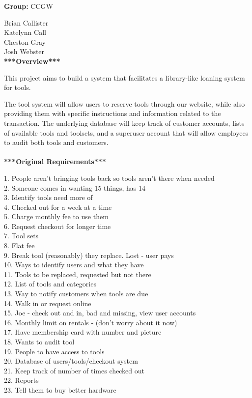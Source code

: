 \documentclass[12pt,letterpaper]{article}
\newcommand\name{
Brian Callister\\
Katelynn Call\\
Cheston Gray\\
Josh Webster
}
\begin{document}
\textbf{Group: } CCGW

\name\\
    
\textbf{***Overview***}

This project aims to build a system that facilitates a library-like loaning system for tools.

The tool system will allow users to reserve tools through our website, while also providing them with specific instructions and information related to the transaction.  The underlying database will keep track of customer accounts, lists of available tools and toolsets, and a superuser account that will allow employees to audit both tools and customers.\\\\

\textbf{***Original Requirements***}

1. People aren't bringing tools back so tools aren't there when needed\\
2. Someone comes in wanting 15 things, has 14\\
3.  Identify tools need more of\\
4.  Checked out for a week at a time\\
5. Charge monthly fee to use them\\
6.  Request checkout for longer time\\
7. Tool sets\\
8. Flat fee\\
9. Break tool (reasonably) they replace.  Lost - user pays\\
10. Ways to identify users and what they have\\
11. Tools to be replaced, requested but not there\\
12. List of tools and categories\\
13. Way to notify customers when tools are due\\
14. Walk in or request online\\
15. Joe - check out and in, bad and missing, view user accounts\\
16. Monthly limit on rentals - (don't worry about it now)\\
17. Have membership card with number and picture\\
18. Wants to audit tool\\
19. People to have access to tools\\
20. Database of users/tools/checkout system\\
21. Keep track of number of times checked out\\
22. Reports\\
23. Tell them to buy better hardware
\end{document}
